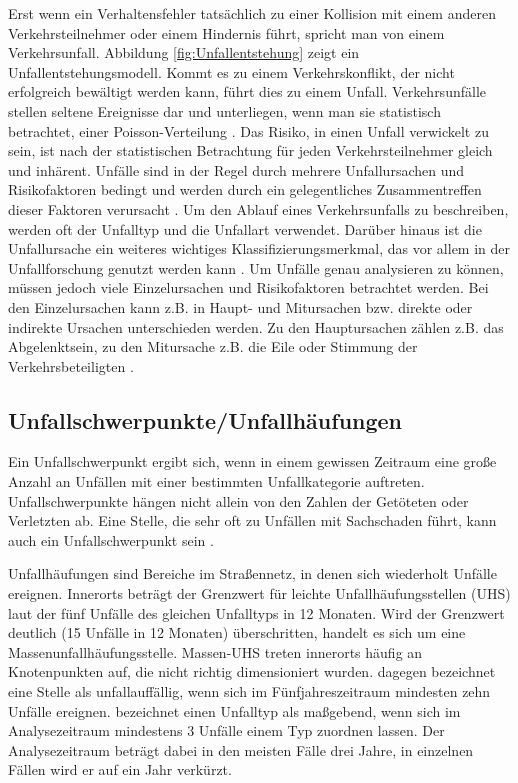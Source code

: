 Erst wenn ein Verhaltensfehler tatsächlich zu einer Kollision mit einem anderen Verkehrsteilnehmer oder einem Hindernis führt, spricht man von einem Verkehrsunfall. Abbildung \ref{fig:Unfallentstehung} zeigt ein Unfallentstehungsmodell. Kommt es zu einem Verkehrskonflikt, der nicht erfolgreich bewältigt werden kann, führt dies zu einem Unfall. Verkehrsunfälle stellen seltene Ereignisse dar und unterliegen, wenn man sie statistisch betrachtet, einer Poisson-Verteilung \parencite[S. 18]{Grundl.2005}. Das Risiko, in einen Unfall verwickelt zu sein, ist nach der statistischen Betrachtung für jeden Verkehrsteilnehmer gleich und inhärent. Unfälle sind in der Regel durch mehrere Unfallursachen und Risikofaktoren bedingt und werden durch ein gelegentliches Zusammentreffen dieser Faktoren verursacht \parencite[S. 20]{Grundl.2005}. Um den Ablauf eines Verkehrsunfalls zu beschreiben, werden oft der Unfalltyp und die Unfallart verwendet. Darüber hinaus ist die Unfallursache ein weiteres wichtiges Klassifizierungsmerkmal, das vor allem in der Unfallforschung genutzt werden kann \parencite[S. 16]{Gschwendtner.2015}. Um Unfälle genau analysieren zu können, müssen jedoch viele Einzelursachen und Risikofaktoren betrachtet werden. Bei den Einzelursachen kann z.B. in Haupt- und Mitursachen bzw. direkte oder indirekte Ursachen unterschieden werden. Zu den Hauptursachen zählen z.B. das Abgelenktsein, zu den Mitursache z.B. die Eile oder Stimmung der Verkehrsbeteiligten \parencite[S. 65-72]{Grundl.2005}. 

\subsection{Unfallschwerpunkte/Unfallhäufungen}\label{subsection:Unfallschwerpunkte}
Ein Unfallschwerpunkt ergibt sich, wenn in einem gewissen Zeitraum eine große Anzahl an Unfällen mit einer bestimmten Unfallkategorie auftreten. Unfallschwerpunkte hängen nicht allein von den Zahlen der Getöteten oder Verletzten ab. Eine Stelle, die sehr oft zu Unfällen mit Sachschaden führt, kann auch ein Unfallschwerpunkt sein \parencite[S. 145-151]{Huguenin.2017}.

Unfallhäufungen sind Bereiche im Straßennetz, in denen sich wiederholt Unfälle ereignen. Innerorts beträgt der Grenzwert für leichte Unfallhäufungsstellen (UHS) laut der \Textcite[S. 13-16]{ForschungsgesellschaftfurStraenundVerkehrswesen.2012} fünf Unfälle des gleichen Unfalltyps in 12 Monaten. Wird der Grenzwert deutlich (15 Unfälle in 12 Monaten) überschritten, handelt es sich um eine Massenunfallhäufungsstelle. Massen-UHS treten innerorts häufig an Knotenpunkten auf, die nicht richtig dimensioniert wurden. \Textcite[S. 221]{Schreiber.2014} dagegen bezeichnet eine Stelle als unfallauffällig, wenn sich im Fünfjahreszeitraum mindesten zehn Unfälle ereignen. \Textcite[S. 325]{Berger.2017} bezeichnet einen Unfalltyp als maßgebend, wenn sich im Analysezeitraum mindestens 3 Unfälle einem Typ zuordnen lassen. Der Analysezeitraum beträgt dabei in den meisten Fälle drei Jahre, in einzelnen Fällen wird er auf ein Jahr verkürzt.

